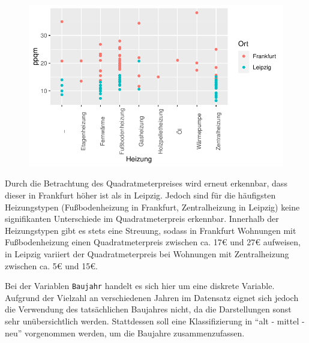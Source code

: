 \documentclass[
  a4paper,
  DIV=11]{scrartcl}
\begin{document}
\begin{figure}[H]

{\centering \includegraphics{Mietmodellierung_files/figure-pdf/unnamed-chunk-14-1.pdf}

}

\end{figure}

Durch die Betrachtung des Quadratmeterpreises wird erneut erkennbar,
dass dieser in Frankfurt höher ist als in Leipzig. Jedoch sind für die
häufigsten Heizungstypen (Fußbodenheizung in Frankfurt, Zentralheizung
in Leipzig) keine signifikanten Unterschiede im Quadratmeterpreis
erkennbar. Innerhalb der Heizungstypen gibt es stets eine Streuung,
sodass in Frankfurt Wohnungen mit Fußbodenheizung einen
Quadratmeterpreis zwischen ca. 17€ und 27€ aufweisen, in Leipzig
variiert der Quadratmeterpreis bei Wohnungen mit Zentralheizung zwischen
ca. 5€ und 15€.

Bei der Variablen \texttt{Baujahr} handelt es sich hier um eine diskrete
Variable. Aufgrund der Vielzahl an verschiedenen Jahren im Datensatz
eignet sich jedoch die Verwendung des tatsächlichen Baujahres nicht, da
die Darstellungen sonst sehr unübersichtlich werden. Stattdessen soll
eine Klassifizierung in ``alt - mittel - neu'' vorgenommen werden, um
die Baujahre zusammenzufassen.
\end{document}
